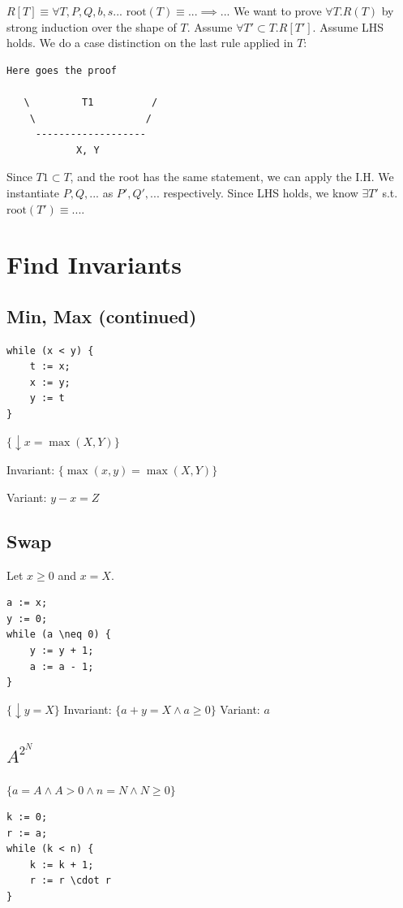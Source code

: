 \documentclass{article}
\begin{document}
$R[T] \equiv \forall T, P, Q, b, s... \text{ root}(T) \equiv ... \implies ...$
We want to prove $\forall T.R(T)$ by strong induction over the shape of $T$. Assume $\forall T' \subset T.R[T']$. Assume LHS holds. We do a case distinction on the last rule applied in $T$:
\begin{verbatim}
Here goes the proof

   \         T1          /
    \                   /
     -------------------
            X, Y
\end{verbatim}
Since $T1 \subset T$, and the root has the same statement, we can apply the I.H. We instantiate $P, Q,...$ as $P', Q',...$ respectively. Since LHS holds, we know $\exists T'$ s.t. $\text{root}(T') \equiv ...$.
\section{Find Invariants}

\subsection{Min, Max (continued)}

\begin{lstlisting}[style=mystyle, caption=Haskell Code, label=code:haskell]
while (x < y) {
    t := x; 
    x := y;
    y := t
}
\end{lstlisting}

$\{\downarrow x = \max(X, Y)\}$

Invariant: $\{ \max(x, y) = \max(X, Y) \}$

Variant: $y - x = Z$

\subsection{Swap}
Let $x \geq 0$ and $x = X$.
\begin{lstlisting}[style=mystyle, caption=Haskell Code, label=code:haskell]
a := x;
y := 0;
while (a \neq 0) {
    y := y + 1;
    a := a - 1;
}
\end{lstlisting}
$\{\downarrow y = X\}$
Invariant: $\{ a + y = X \land a \geq 0 \}$
Variant: $a$
\subsection{$A^{2^N}$}
$\{ a = A \land A > 0 \land n = N \land N \geq 0 \}$
\begin{lstlisting}[style=mystyle, caption=Haskell Code, label=code:haskell]
k := 0;
r := a;
while (k < n) {
    k := k + 1;
    r := r \cdot r
}
\end{lstlisting}
\end{document}
